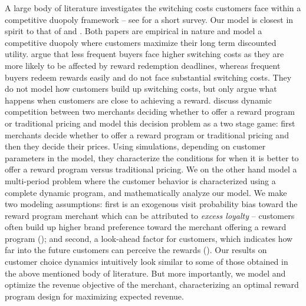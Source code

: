 A large body of literature investigates the switching costs customers face within a competitive duopoly framework -- see \cite{villas2015short} for a short survey.
Our model is closest in spirit to that of \cite{hartmann2008frequency} and \cite{kopalle2001economic}.
Both papers are empirical in nature and model a competitive duopoly where customers maximize their long term discounted utility.
\cite{hartmann2008frequency} argue that less frequent buyers face higher switching costs as they are more likely to be affected by reward redemption deadlines, whereas frequent buyers redeem rewards easily and do not face substantial switching costs. 
They do not model how customers build up switching costs, but only argue what happens when customers are close to achieving a reward.
\cite{kopalle2001economic} discuss dynamic competition between two merchants deciding whether to offer a reward program or traditional pricing and model this decision problem as a two stage game: first merchants decide whether to offer a reward program or traditional pricing and then they decide their prices. 
Using simulations, depending on customer parameters in the model, they characterize the conditions for when it is better to offer a reward program versus traditional pricing.
We on the other hand model a multi-period problem where the customer behavior is characterized using a complete dynamic program, and mathematically analyze our model.
We make two modeling assumptions: first is an exogenous visit probability bias toward the reward program merchant which can be attributed to \emph{excess loyalty} -- customers often build up higher brand preference toward the merchant offering a reward program (\cite{fader1993excess, sharp1997loyalty}); 
and second, a look-ahead factor for customers, which indicates how far into the future customers can perceive the rewards (\cite{liu2007long,lewis2004influence}).
Our results on customer choice dynamics intuitively look similar to some of those obtained in the above mentioned body of literature.
But more importantly, we model and optimize the revenue objective of the merchant, characterizing an optimal reward program design for maximizing expected revenue.
